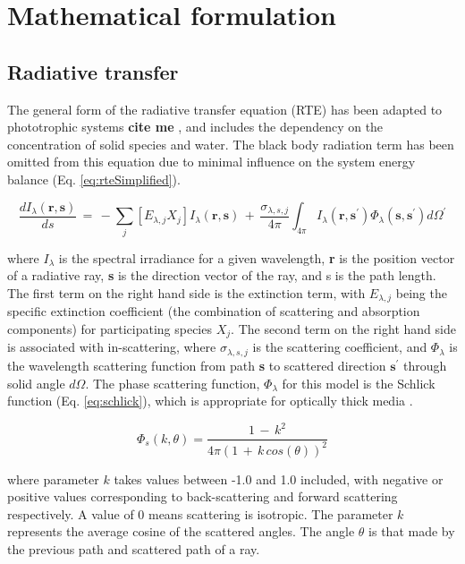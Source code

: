 
\newpage
\section{Mathematical formulation}
\label{S:formulation}
\subsection{Radiative transfer}
The general form of the radiative transfer equation (RTE) has been adapted to phototrophic systems \textbf{cite me} \cite{kong2014}, and includes the dependency on the concentration of solid species and water. The black body radiation term has been omitted from this equation due to minimal influence on the system energy balance (Eq. \ref{eq:rteSimplified}). 

\begin{equation}
\frac{dI_\lambda (\textbf{r}, \textbf{s})}{ds} \, = \, - \sum_{j} [E_{\lambda,j} X_j] I_\lambda (\textbf{r}, \textbf{s})\, +\, \frac{\sigma_{\lambda, s, j}}{4 \pi} \int_{4 \pi} I_\lambda (\textbf{r}, \textbf{s}^\prime) \Phi_\lambda(\textbf{s}, \textbf{s}^\prime) d\Omega^\prime
    \end{equation}

where $I_\lambda$ is the spectral irradiance for a given wavelength, \textbf{r} is the position vector of a radiative ray, \textbf{s} is the direction vector of the ray, and s is the path length. The first term on the right hand side is the extinction term, with $E_{\lambda, j}$ being the specific extinction coefficient (the combination of scattering and absorption components) for participating species $X_j$. The second term on the right hand side is associated with in-scattering, where $\sigma_{\lambda, s, j}$ is the scattering coefficient, and $\Phi_\lambda$ is the wavelength scattering function from path \textbf{s} to scattered direction $\textbf{s}^\prime$ through solid angle $d\Omega$. The phase scattering function, $\Phi_\lambda$ for this model is the Schlick function (Eq. \ref{eq:schlick}), which is appropriate for optically thick media \cite{jarosz2008}. 

\begin{equation}
\Phi_s(k, \theta) = \frac{1 \, -\,  k^2}{4\pi (1\, +\,k\, cos(\theta))^2 }
\end{equation}

where parameter $k$ takes values between -1.0 and 1.0 included, with negative or positive values corresponding to back-scattering and forward scattering respectively. A value of 0 means scattering is isotropic. The parameter $k$ represents the average cosine of the scattered angles. The angle $\theta$ is that made by the previous path and scattered path of a ray.

